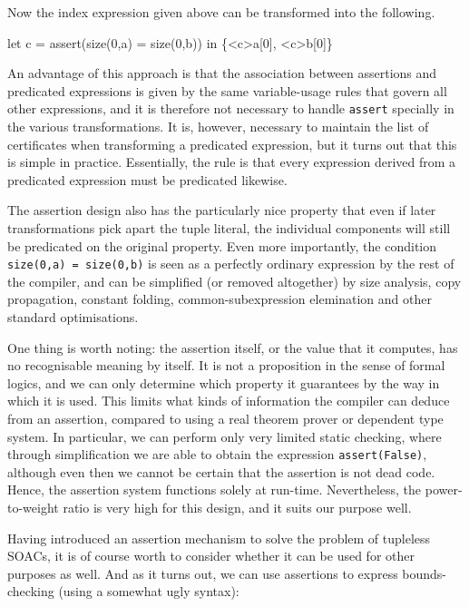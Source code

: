 Now the index expression given above can be transformed into the
following.

\begin{colorcode}
let c = assert(size(0,a) = size(0,b)) in
\{<c>a[0], <c>b[0]\}
\end{colorcode}

An advantage of this approach is that the association between
assertions and predicated expressions is given by the same
variable-usage rules that govern all other expressions, and it is
therefore not necessary to handle \texttt{assert} specially in the
various transformations.  It is, however, necessary to maintain the
list of certificates when transforming a predicated expression, but it
turns out that this is simple in practice.  Essentially, the rule is
that every expression derived from a predicated expression must be
predicated likewise.

The assertion design also has the particularly nice property that even
if later transformations pick apart the tuple literal, the individual
components will still be predicated on the original property.  Even
more importantly, the condition \texttt{size(0,a) = size(0,b)} is
seen as a perfectly ordinary expression by the rest of the compiler,
and can be simplified (or removed altogether) by size analysis, copy
propagation, constant folding, common-subexpression elemination and
other standard optimisations.

One thing is worth noting: the assertion itself, or the value that it
computes, has no recognisable meaning by itself.  It is not a
proposition in the sense of formal logics, and we can only determine
which property it guarantees by the way in which it is used.  This
limits what kinds of information the compiler can deduce from an
assertion, compared to using a real theorem prover or dependent type
system.  In particular, we can perform only very limited static
checking, where through simplification we are able to obtain the
expression \texttt{assert(False)}, although even then we cannot be
certain that the assertion is not dead code.  Hence, the assertion
system functions solely at run-time.  Nevertheless, the
power-to-weight ratio is very high for this design, and it suits our
purpose well.

Having introduced an assertion mechanism to solve the problem of
tupleless SOACs, it is of course worth to consider whether it can be
used for other purposes as well.  And as it turns out, we can use
assertions to express bounds-checking (using a somewhat ugly syntax):

